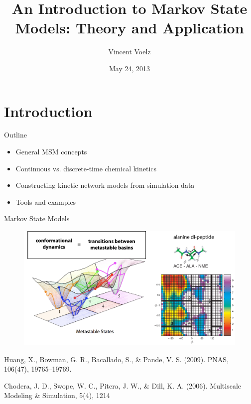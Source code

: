 \documentclass{beamer}
\title[An Introduction to Markov State Models: Theory and Application]{An Introduction to Markov State Models: Theory and Application}
\author{Vincent Voelz}
\institute{Temple University}
\date{May 24, 2013}
\begin{document}
\begin{frame}
  \titlepage
\end{frame}


\section{Introduction}

\begin{frame}{Outline}

\begin{itemize}
  \item General MSM concepts
  \item Continuous vs. discrete-time chemical kinetics
  \item Constructing kinetic network models from simulation data
  \item Tools and examples
\end{itemize}

\vskip 1cm

\end{frame}

\begin{frame}{Markov State Models}

\begin{figure}
\includegraphics[width=1.0\textwidth]{MSMs}
\end{figure}


\tiny
Huang, X., Bowman, G. R., Bacallado, S., \& Pande, V. S. (2009). PNAS, 106(47), 19765–19769.

Chodera, J. D., Swope, W. C., Pitera, J. W., \& Dill, K. A. (2006).  Multiscale Modeling \& Simulation, 5(4), 1214
\normalsize

\end{frame}
\end{document}
